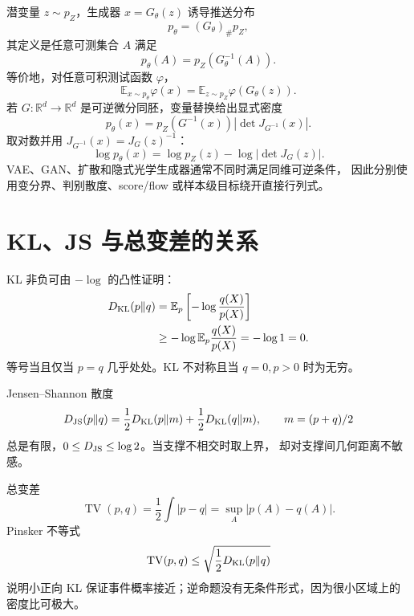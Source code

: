 \documentclass[11pt]{article}
\numberwithin{equation}{section}
\newcommand{\R}{\mathbb{R}}
\newcommand{\E}{\mathbb{E}}
\newcommand{\1}{\mathbf{1}}
\begin{document}
潜变量 $z\sim p_Z$，生成器 $x=G_\theta(z)$ 诱导推送分布
\begin{equation}
 p_\theta=(G_\theta)_\#p_Z,
\end{equation}
其定义是任意可测集合 $A$ 满足
\begin{equation}
 p_\theta(A)=p_Z(G_\theta^{-1}(A)).
\end{equation}
等价地，对任意可积测试函数 $\varphi$，
\begin{equation}
 \E_{x\sim p_\theta}\varphi(x)
 =\E_{z\sim p_Z}\varphi(G_\theta(z)).
\end{equation}
若 $G:\R^d\to\R^d$ 是可逆微分同胚，变量替换给出显式密度
\begin{equation}
 p_\theta(x)=p_Z(G^{-1}(x))
 \left|\det J_{G^{-1}}(x)\right|.
\end{equation}
取对数并用 $J_{G^{-1}}(x)=J_G(z)^{-1}$：
\begin{equation}
 \log p_\theta(x)=\log p_Z(z)-\log|\det J_G(z)|.
\end{equation}
VAE、GAN、扩散和隐式光学生成器通常不同时满足同维可逆条件，
因此分别使用变分界、判别散度、score/flow 或样本级目标绕开直接行列式。

\section{KL、JS 与总变差的关系}

KL 非负可由 $-\log$ 的凸性证明：
\begin{align}
 D_{\rm KL}(p\|q)
 &=\E_p\left[-\log\frac{q(X)}{p(X)}\right]\\
 &\ge-\log\E_p\frac{q(X)}{p(X)}=-\log1=0.
\end{align}
等号当且仅当 $p=q$ 几乎处处。KL 不对称且当 $q=0,p>0$ 时为无穷。

Jensen--Shannon 散度
\begin{equation}
 D_{\rm JS}(p\|q)=\frac12D_{\rm KL}(p\|m)
 +\frac12D_{\rm KL}(q\|m),\qquad m=(p+q)/2
\end{equation}
总是有限，$0\le D_{\rm JS}\le\log2$。当支撑不相交时取上界，
却对支撑间几何距离不敏感。

总变差
\begin{equation}
 \operatorname{TV}(p,q)=\frac12\int|p-q|
 =\sup_A|p(A)-q(A)|.
\end{equation}
Pinsker 不等式
\begin{equation}
 \operatorname{TV}(p,q)
 \le\sqrt{\frac12D_{\rm KL}(p\|q)}
\end{equation}
说明小正向 KL 保证事件概率接近；逆命题没有无条件形式，因为很小区域上的密度比可极大。
\end{document}
